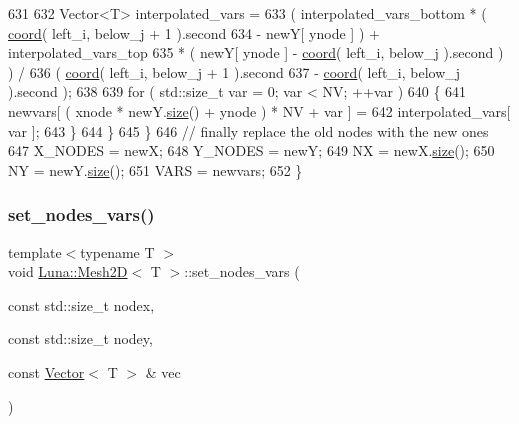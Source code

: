 \begin{DoxyCode}
631 
632         Vector<T> interpolated\_vars =
633           (  interpolated\_vars\_bottom * ( \hyperlink{classLuna_1_1Mesh2D_add4d12155922731ccf59fe4454699eed}{coord}( left\_i, below\_j + 1 ).second
634           - newY[ ynode ] ) +  interpolated\_vars\_top
635           * ( newY[ ynode ] - \hyperlink{classLuna_1_1Mesh2D_add4d12155922731ccf59fe4454699eed}{coord}( left\_i, below\_j ).second ) ) /
636           ( \hyperlink{classLuna_1_1Mesh2D_add4d12155922731ccf59fe4454699eed}{coord}( left\_i, below\_j + 1 ).second
637           - \hyperlink{classLuna_1_1Mesh2D_add4d12155922731ccf59fe4454699eed}{coord}( left\_i, below\_j ).second );
638 
639         \textcolor{keywordflow}{for} ( std::size\_t var = 0; var < NV; ++var )
640         \{
641           newvars[ ( xnode * newY.\hyperlink{classLuna_1_1Vector_ac9b6ed7a0df401728f27c193fbc8f4d8}{size}() + ynode ) * NV + var ] =
642                                                        interpolated\_vars[ var ];
643         \}
644       \}
645     \}
646     \textcolor{comment}{// finally replace the old nodes with the new ones}
647     X\_NODES = newX;
648     Y\_NODES = newY;
649     NX = newX.\hyperlink{classLuna_1_1Vector_ac9b6ed7a0df401728f27c193fbc8f4d8}{size}();
650     NY = newY.\hyperlink{classLuna_1_1Vector_ac9b6ed7a0df401728f27c193fbc8f4d8}{size}();
651     VARS = newvars;
652   \}
\end{DoxyCode}
\mbox{\label{classLuna_1_1Mesh2D_a40ceeeb39bb653c05a4b5c084e676e34}} 
\subsubsection{\texorpdfstring{set\+\_\+nodes\+\_\+vars()}{set\_nodes\_vars()}}
{\footnotesize\ttfamily template$<$typename T $>$ \\
void \hyperlink{classLuna_1_1Mesh2D}{Luna\+::\+Mesh2D}$<$ T $>$\+::set\+\_\+nodes\+\_\+vars (\begin{DoxyParamCaption}\item[{const std\+::size\+\_\+t}]{nodex,  }\item[{const std\+::size\+\_\+t}]{nodey,  }\item[{const \hyperlink{classLuna_1_1Vector}{Vector}$<$ T $>$ \&}]{vec }\end{DoxyParamCaption})\hspace{0.3cm}{\ttfamily [inline]}}



